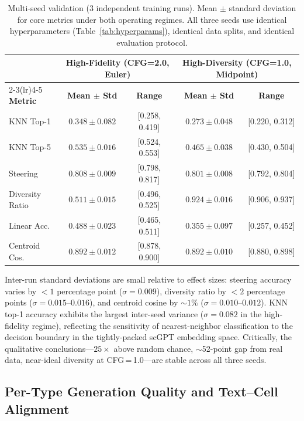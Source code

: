 \documentclass[biology,article,submit,pdftex,moreauthors]{Definitions/mdpi}
\begin{document}
\begin{table}[!htbp]
\caption{Multi-seed validation (3 independent training runs). Mean $\pm$ standard deviation for core metrics under both operating regimes. All three seeds use identical hyperparameters (Table~\ref{tab:hyperparams}), identical data splits, and identical evaluation protocol.\label{tab:multi-seed}}
\centering
\small
\begin{tabular}{lcccc}
\toprule
 & \multicolumn{2}{c}{\textbf{High-Fidelity (CFG=2.0, Euler)}} & \multicolumn{2}{c}{\textbf{High-Diversity (CFG=1.0, Midpoint)}} \\
\cmidrule(lr){2-3}\cmidrule(lr){4-5}
\textbf{Metric} & \textbf{Mean $\pm$ Std} & \textbf{Range} & \textbf{Mean $\pm$ Std} & \textbf{Range} \\
\midrule
KNN Top-1      & $0.348 \pm 0.082$ & [0.258, 0.419] & $0.273 \pm 0.048$ & [0.220, 0.312] \\
KNN Top-5      & $0.535 \pm 0.016$ & [0.524, 0.553] & $0.465 \pm 0.038$ & [0.430, 0.504] \\
Steering       & $0.808 \pm 0.009$ & [0.798, 0.817] & $0.801 \pm 0.008$ & [0.792, 0.804] \\
Diversity Ratio & $0.511 \pm 0.015$ & [0.496, 0.525] & $0.924 \pm 0.016$ & [0.906, 0.937] \\
Linear Acc.    & $0.488 \pm 0.023$ & [0.465, 0.511] & $0.355 \pm 0.097$ & [0.257, 0.452] \\
Centroid Cos.  & $0.892 \pm 0.012$ & [0.878, 0.900] & $0.892 \pm 0.010$ & [0.880, 0.898] \\
\bottomrule
\end{tabular}
\end{table}

Inter-run standard deviations are small relative to effect sizes: steering accuracy varies by $< 1$ percentage point ($\sigma = 0.009$), diversity ratio by $< 2$ percentage points ($\sigma = 0.015$--$0.016$), and centroid cosine by $\sim 1\%$ ($\sigma = 0.010$--$0.012$). KNN top-1 accuracy exhibits the largest inter-seed variance ($\sigma = 0.082$ in the high-fidelity regime), reflecting the sensitivity of nearest-neighbor classification to the decision boundary in the tightly-packed scGPT embedding space. Critically, the qualitative conclusions---$25\times$ above random chance, $\sim$52-point gap from real data, near-ideal diversity at CFG\,=\,1.0---are stable across all three seeds.

\subsection{Per-Type Generation Quality and Text--Cell Alignment}
\end{document}
